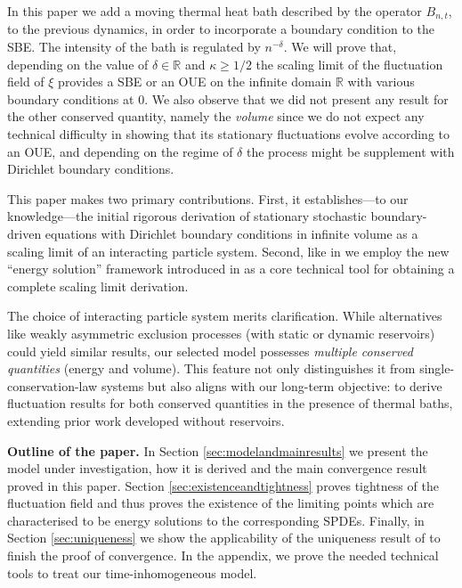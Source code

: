\documentclass[a4paper, reqno, 12pt]{amsart}
\theoremstyle{plain}
\theoremstyle{definition}
\begin{document}
\bigskip

In this paper we add a moving thermal heat bath described by the operator $B_{n,t}$, to the previous dynamics, in order to incorporate a boundary condition to the SBE. The intensity of the bath is regulated by $n^{-\delta}$. We will prove that, depending on the value of $\delta \in \mathbb R$ and $\kappa\ge 1/2$ the scaling limit of the fluctuation field of $\xi$ provides a SBE or an OUE on the infinite domain $\mathbb R$ with various boundary conditions at $0$. We also observe that we did not present any result for the other conserved quantity, namely the \textit{volume} since we do not expect any technical difficulty in showing that its stationary fluctuations evolve according to an OUE, and depending on the regime of $\delta$ the process might be supplement with Dirichlet boundary conditions.

\bigskip 

This paper makes two primary contributions. First, it establishes---to our knowledge---the initial rigorous derivation of stationary stochastic boundary-driven equations with Dirichlet boundary conditions in infinite volume as a scaling limit of an interacting particle system. Second, like in \cite{CG25} we employ the new ``energy solution'' framework introduced in \cite{GPP24} as a core technical tool for obtaining a complete scaling limit derivation.

\bigskip 

The choice of interacting particle system merits clarification. While alternatives like weakly asymmetric exclusion processes (with static or dynamic reservoirs) could yield similar results, our selected model possesses \textit{multiple conserved quantities} (energy and volume). This feature not only distinguishes it from single-conservation-law systems but also aligns with our long-term objective: to derive fluctuation results for both conserved quantities in the presence of thermal baths, extending prior work \cite{ABGS22} developed without reservoirs.




\bigskip

\textbf{Outline of the paper.} In Section \ref{sec:modelandmainresults} we present the model under investigation, how it is derived and the main convergence result proved in this paper. Section \ref{sec:existenceandtightness} proves tightness of the fluctuation field and thus proves the existence of the limiting points which are characterised to be energy solutions to the corresponding SPDEs. Finally, in Section \ref{sec:uniqueness} we show the applicability of the uniqueness result of \cite{GPP24} to finish the proof of convergence. In the appendix, we prove the needed technical tools to treat our time-inhomogeneous model.
\end{document}
